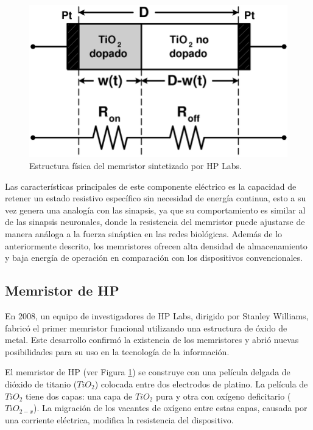 \documentclass[conference]{IEEEtran}
\begin{document}
\begin{figure}[ht]
	\centering
	\includegraphics[scale=0.27]{img/MemristorHP.png}
	\caption{Estructura física del memristor sintetizado por HP Labs.
		\label{fig:memristorhp}}
\end{figure}

Las características principales de este componente eléctrico es la capacidad de retener un estado resistivo específico sin necesidad de energía continua, esto a su vez genera una analogía con las sinapsis, ya que su comportamiento es similar al de las sinapsis neuronales, donde la resistencia del memristor puede ajustarse de manera análoga a la fuerza sináptica en las redes biológicas. Además de lo anteriormente descrito, los memristores ofrecen alta densidad de almacenamiento y baja energía de operación en comparación con los dispositivos convencionales.

\subsection{Memristor de HP}
En 2008, un equipo de investigadores de HP Labs, dirigido por Stanley Williams, fabricó el primer memristor funcional utilizando una estructura de óxido de metal. Este desarrollo confirmó la existencia de los memristores y abrió nuevas posibilidades para su uso en la tecnología de la información.

El memristor de HP (ver Figura \ref{fig:memristorhp}) se construye con una película delgada de dióxido de titanio ($TiO_{2}$) colocada entre dos electrodos de platino. La película de $TiO_{2}$ tiene dos capas: una capa de $TiO_{2}$ pura y otra con oxígeno deficitario ($TiO_{2-x}$). La migración de los vacantes de oxígeno entre estas capas, causada por una corriente eléctrica, modifica la resistencia del dispositivo.
\end{document}
